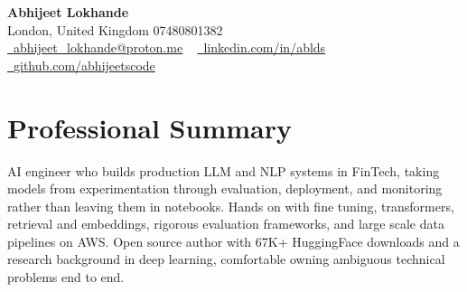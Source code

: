 \documentclass[a4paper,10pt]{article}
\begin{document}
    \begin{center}
        {\Huge\bfseries Abhijeet Lokhande}
        \\[2pt] {\color{muted}London, United Kingdom \textbar{} 07480801382}\\
        \small
        \href{mailto:abhijeet_lokhande@proton.me}{\raisebox{-0.2\height}{\color{primary}\faEnvelope}\  \underline{abhijeet\_lokhande@proton.me}} ~
        \href{https://www.linkedin.com/in/ablds/}{\raisebox{-0.2\height}{\color{primary}\faLinkedin}\ \underline{linkedin.com/in/ablds}}  ~
        \href{https://github.com/abhijeetscode}{\raisebox{-0.2\height}{\color{primary}\faGithub}\ \underline{github.com/abhijeetscode}}
    \end{center}

\section{Professional Summary}
\vspace{-5pt}
{\color{muted}AI engineer who builds production LLM and NLP systems in FinTech, taking models from experimentation through evaluation, deployment, and monitoring rather than leaving them in notebooks. Hands on with fine tuning, transformers, retrieval and embeddings, rigorous evaluation frameworks, and large scale data pipelines on AWS. Open source author with 67K+ HuggingFace downloads and a research background in deep learning, comfortable owning ambiguous technical problems end to end.}
\vspace{2pt}

\end{document}
